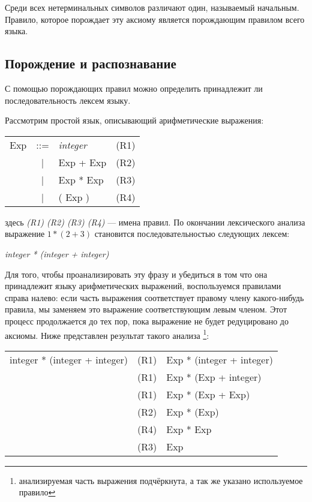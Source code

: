     Среди всех нетерминальных символов различают один, называемый начальным.
Правило, которое порождает эту аксиому является порождающим правилом всего
языка.

\subsection{Порождение и распознавание}
\label{page_ref:Production_and_Recognition}

С помощью порождающих правил можно определить принадлежит ли последовательность
лексем языку.

Рассмотрим простой язык, описывающий арифметические выражения:

\begin{center}
	\begin{tabular}{rclc}
		Exp & ::= & {\it integer} & (R1) \\
		 & | & Exp + Exp & (R2) \\
		 & | & Exp * Exp & (R3) \\
		 & | & ( Exp ) & (R4)
	\end{tabular}
\end{center}

здесь {\it (R1) (R2) (R3) (R4)} --- имена правил. По окончании лексического
анализа выражение $1*(2+3)$ становится последовательностью следующих лексем:

\begin{center}
{\it integer * (integer + integer)}
\end{center}

Для того, чтобы проанализировать эту фразу и убедиться в том что она принадлежит
языку арифметических выражений, воспользуемся правилами справа налево: если
часть выражения соответствует правому члену какого-нибудь правила, мы заменяем
это выражение соответствующим левым членом. Этот процесс продолжается до тех
пор, пока выражение не будет редуцировано до аксиомы. Ниже представлен результат
такого анализа \footnote{анализируемая часть выражения подчёркнута, а так же
указано используемое правило }:

\begin{center}
	\begin{tabular}{rcl}
		integer * (integer + integer) & (R1) & Exp * (integer + integer) \\
		& (R1) & Exp * (Exp + integer) \\
		& (R1) & Exp * (Exp + Exp) \\
		& (R2) & Exp * (Exp) \\
		& (R4) & Exp * Exp \\
		& (R3) & Exp
	\end{tabular}
\end{center}

